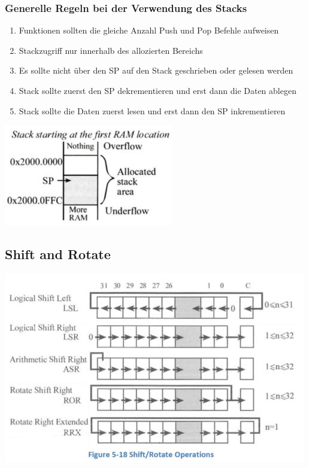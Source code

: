 \subsubsection{Generelle Regeln bei der Verwendung des Stacks}
\begin{multicols}{2}
    \begin{enumerate}
        \item Funktionen sollten die gleiche Anzahl Push und Pop Befehle aufweisen
        \item Stackzugriff nur innerhalb des allozierten Bereichs
        \item Es sollte nicht über den SP auf den Stack geschrieben oder gelesen werden
        \item Stack sollte zuerst den SP dekrementieren und erst dann die Daten ablegen
        \item Stack sollte die Daten zuerst lesen und erst dann den SP inkrementieren
    \end{enumerate}
    \includegraphics[width=0.8\linewidth]{images/allocatedStack}  
\end{multicols}

\subsection{Shift and Rotate}
\includegraphics[width=0.8\linewidth]{images/shiftandrotate} 
